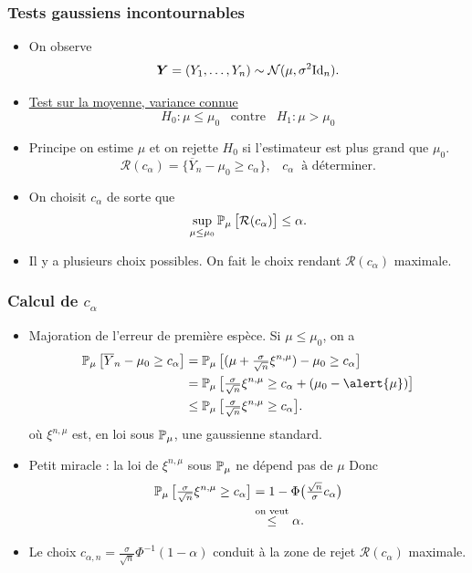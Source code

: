 \begin{frame}
\frametitle{Tests gaussiens incontournables}
\begin{itemize}
\item On observe
$$\operatorname{\boldsymbol{Y}}=(Y_1,\ldots, Y_n) \sim {\mathcal N}(\mu, \sigma^2 \text{Id}_n).$$
\item \underline{\alert{Test sur la moyenne, variance connue}}
$$H_0:\mu \leq \mu_0\;\;\;\text{contre}\;\;\;H_1:\mu > \mu_0$$
\item \alert{ Principe} on estime $\mu$ et on rejette $H_0$ si l'estimateur est  plus grand  que $\mu_0$.
$${\mathcal R}(c_\alpha) = \big\{\overline{Y}_n - \mu_0 \geq c_\alpha\big\},\;\;\;c_\alpha\;\;\text{à déterminer}.$$
\item On choisit $c_\alpha$ de sorte que
$$\sup_{\mu \leq \mu_0}\operatorname{{\mathbb P}}_\mu\big[{\mathcal R}(c_\alpha)\big] \leq \alpha.$$
\item Il y a \alert{plusieurs choix possibles}. On fait le choix rendant  ${\mathcal R}(c_\alpha)$ \alert{  maximale}.
\end{itemize}
\end{frame}

\begin{frame}
\frametitle{Calcul de $c_\alpha$}
\begin{itemize}
\item \alert{Majoration de l'erreur de première espèce}. Si $\mu \leq \mu_0$, on a
\begin{align*}
\PP_{\mu}\big[\overline{Y}_n - \mu_0 \geq c_\alpha\big] & = \PP_\mu\big[(\mu+\tfrac{\sigma}{\sqrt{n}}\xi^{n,\mu})-\mu_0 \geq c_\alpha\big] \\
& =   \PP_{\mu}\big[\tfrac{\sigma}{\sqrt{n}}\xi^{n,\mu} \geq c_\alpha + (\mu_0-\alert{\mu})\big] \\
& \leq \PP_{\mu}\big[\tfrac{\sigma}{\sqrt{n}}\xi^{n,\mu} \geq c_\alpha\big].
\end{align*}
où $\xi^{n,\mu}$ est, en loi sous $\operatorname{{\mathbb P}}_\mu$, une gaussienne standard.
\item \alert{ Petit miracle} : la loi de $\xi^{n,\mu}$ sous $\operatorname{{\mathbb P}}_\mu$ ne \alert{dépend pas de} $\mu$
Donc
\begin{align*}
\operatorname{{\mathbb P}}_{\mu}\big[\tfrac{\sigma}{\sqrt{n}}\xi^{n,\mu} \geq c_\alpha\big] & =1-\Phi\big(\tfrac{\sqrt{n}}{\sigma}c_\alpha\big) \\
& \stackrel{\text{on veut}}{\leq} \alpha.
\end{align*}
\item Le choix $c_{\alpha,n} = \tfrac{\sigma}{\sqrt{n}}\Phi^{-1}(1-\alpha)$ conduit à la zone de rejet ${\mathcal R}(c_\alpha)$ \alert{maximale}.
\end{itemize}
\end{frame}


